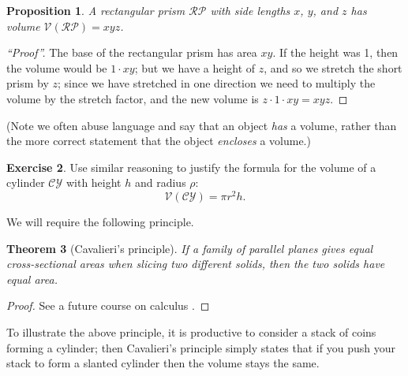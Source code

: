 \documentclass[a4paper]{report}
\newtheorem{thm}{Theorem}
\newtheorem{prp}[thm]{Proposition}
\theoremstyle{definition}
\newtheorem{exercise}[thm]{Exercise}
\begin{document}
  \begin{prp}
    A rectangular prism $ \mathcal{RP} $ with side lengths $ x $, $ y $, and $ z $ has volume $ \mathcal{V}(\mathcal{RP}) = xyz $.
  \end{prp}
  \begin{proof}[``Proof'']
    The base of the rectangular prism has area $ xy $. If the height was 1, then the volume would be $ 1 \cdot xy $;
    but we have a height of $ z $, and so we stretch the short prism by $ z $; since we have stretched in one direction
    we need to multiply the volume by the stretch factor, and the new volume is $ z \cdot 1 \cdot xy = xyz $.
  \end{proof}


  (Note we often abuse language and say that an object \emph{has} a volume, rather than the more correct statement that
  the object \emph{encloses} a volume.)

  \begin{exercise}
    Use similar reasoning to justify the formula for the volume of a cylinder $ \mathcal{CY} $ with height $ h $ and radius $ \rho $:
    \begin{equation}
      \mathcal{V}(\mathcal{CY}) = \pi r^2 h.
    \end{equation}
  \end{exercise}

  We will require the following principle.
  \begin{thm}[Cavalieri's principle]
    If a family of parallel planes gives equal cross-sectional areas when slicing two different
    solids, then the two solids have equal area.
  \end{thm}
  \begin{proof}
    See a future course on calculus \autocite[page 362, exercise 5.2.63]{stewart}.
  \end{proof}

  To illustrate the above principle, it is productive to consider a stack of coins forming a cylinder;
  then Cavalieri's principle simply states that if you push your stack to form a slanted cylinder then
  the volume stays the same.
\end{document}

